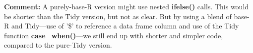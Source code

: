 \documentclass[11pt]{article}
\begin{document}
\begin{parcolumns}[rulebetween=true]{2}


\hspace{0.05in}


\end{parcolumns}

\textbf{Comment:}  A purely-base-R version might use nested
\textbf{ifelse()} calls.  This would be shorter than the Tidy version,
but not as clear.  But by using a blend of base-R and Tidy---use of '\$'
to reference a data frame column and use of the Tidy function
\textbf{case\_when()}---we still end up with shorter and simpler code,
compared to the pure-Tidy version.
\end{document}
